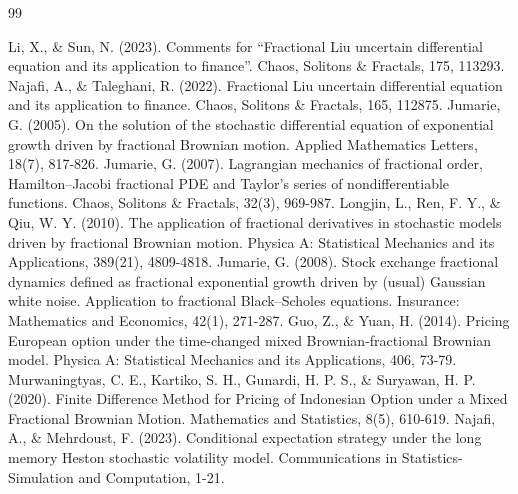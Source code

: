 \documentclass[a4paper,fleqn]{cas-dc}
\begin{document}
	\begin{thebibliography}{99} 
		
		Li, X., \& Sun, N. (2023). Comments for “Fractional Liu uncertain differential equation and its application to finance”. Chaos, Solitons \& Fractals, 175, 113293.
		Najafi, A., \& Taleghani, R. (2022). Fractional Liu uncertain differential equation and its application to finance. Chaos, Solitons \& Fractals, 165, 112875.
		Jumarie, G. (2005). On the solution of the stochastic differential equation of exponential growth driven by fractional Brownian motion. Applied Mathematics Letters, 18(7), 817-826.
		Jumarie, G. (2007). Lagrangian mechanics of fractional order, Hamilton–Jacobi fractional PDE and Taylor’s series of nondifferentiable functions. Chaos, Solitons \& Fractals, 32(3), 969-987.
		Longjin, L., Ren, F. Y., \& Qiu, W. Y. (2010). The application of fractional derivatives in stochastic models driven by fractional Brownian motion. Physica A: Statistical Mechanics and its Applications, 389(21), 4809-4818.
		Jumarie, G. (2008). Stock exchange fractional dynamics defined as fractional exponential growth driven by (usual) Gaussian white noise. Application to fractional Black–Scholes equations. Insurance: Mathematics and Economics, 42(1), 271-287.
		Guo, Z., \& Yuan, H. (2014). Pricing European option under the time-changed mixed Brownian-fractional Brownian model. Physica A: Statistical Mechanics and its Applications, 406, 73-79. 
		Murwaningtyas, C. E., Kartiko, S. H., Gunardi, H. P. S., \& Suryawan, H. P. (2020). Finite Difference Method for Pricing of Indonesian Option under a Mixed Fractional Brownian Motion. Mathematics and Statistics, 8(5), 
		610-619.
		Najafi, A., \& Mehrdoust, F. (2023). Conditional expectation strategy under the long memory Heston stochastic volatility model. Communications in Statistics-Simulation and Computation, 1-21.
	\end{thebibliography}
	
\end{document}
